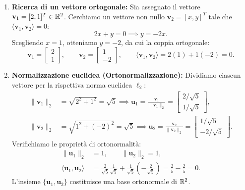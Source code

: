 \begin{example}
\mbox{}\par\nopagebreak
\begin{enumerate}
    \item \textbf{Ricerca di un vettore ortogonale:}
    Sia assegnato il vettore $\mathbf{v}_1 = [2, 1]^T \in \mathbb{R}^2$. Cerchiamo un vettore non nullo $\mathbf{v}_2 = [x, y]^T$ tale che $\langle \mathbf{v}_1, \mathbf{v}_2 \rangle = 0$:
    \begin{equation}
        2x + y = 0 \implies y = -2x.
    \end{equation}
    Scegliendo $x = 1$, otteniamo $y = -2$, da cui la coppia ortogonale:
    \begin{equation}
        \mathbf{v}_1 = \begin{bmatrix} 2 \\ 1 \end{bmatrix}, \qquad \mathbf{v}_2 = \begin{bmatrix} 1 \\ -2 \end{bmatrix}, \qquad \langle \mathbf{v}_1, \mathbf{v}_2 \rangle = 2(1) + 1(-2) = 0.
    \end{equation}
    \item \textbf{Normalizzazione euclidea (Ortonormalizzazione):}
    Dividiamo ciascun vettore per la rispettiva norma euclidea $\ell_2$:
    \begin{align}
        \|\mathbf{v}_1\|_2 &= \sqrt{2^2 + 1^2} = \sqrt{5} \implies \mathbf{u}_1 = \frac{\mathbf{v}_1}{\|\mathbf{v}_1\|_2} = \begin{bmatrix} 2/\sqrt{5} \\ 1/\sqrt{5} \end{bmatrix}, \\
        \|\mathbf{v}_2\|_2 &= \sqrt{1^2 + (-2)^2} = \sqrt{5} \implies \mathbf{u}_2 = \frac{\mathbf{v}_2}{\|\mathbf{v}_2\|_2} = \begin{bmatrix} 1/\sqrt{5} \\ -2/\sqrt{5} \end{bmatrix}.
    \end{align}
    Verifichiamo le propriet\`a di ortonormalit\`a:
    \begin{align}
        \|\mathbf{u}_1\|_2 &= 1, \qquad \|\mathbf{u}_2\|_2 = 1, \\
        \langle \mathbf{u}_1, \mathbf{u}_2 \rangle &= \frac{2}{\sqrt{5}}\frac{1}{\sqrt{5}} + \frac{1}{\sqrt{5}}\left(-\frac{2}{\sqrt{5}}\right) = \frac{2}{5} - \frac{2}{5} = 0.
    \end{align}
    L'insieme $\{\mathbf{u}_1, \mathbf{u}_2\}$ costituisce una base ortonormale di $\mathbb{R}^2$.
\end{enumerate}
\end{example}

